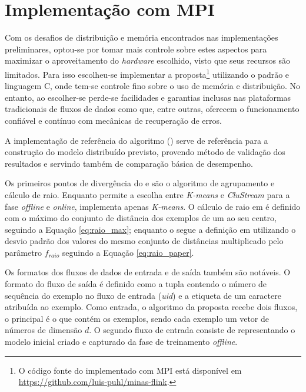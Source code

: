 
\section{Implementação com MPI}

Com os desafios de distribuição e memória encontrados nas implementações
preliminares, optou-se por tomar mais controle sobre estes aspectos para
maximizar o aproveitamento do \emph{hardware} escolhido, visto que seus recursos
são limitados.
Para isso escolheu-se implementar a proposta\footnote{
    O código fonte do \mfog implementado com MPI está disponível em \url{https://github.com/luis-puhl/minas-flink}.
} utilizando o
padrão \mpi e linguagem C, onde tem-se controle fino sobre o uso de memória e
distribuição.
No entanto, ao escolher-se \mpi perde-se facilidades e garantias inclusas nas
plataformas tradicionais de fluxos de dados como \flink que, entre outras,
oferecem o funcionamento confiável e contínuo com mecânicas de recuperação de
erros.

A implementação de referência do algoritmo \minas \cite{Faria2013source}
() serve de referência para a construção do modelo distribuído
previsto, provendo método de validação dos resultados e servindo também de
comparação básica de desempenho.

Os primeiros pontos de divergência do \mfog e  são o algoritmo de
agrupamento e cálculo de raio.
Enquanto  permite a escolha entre \emph{K-means} e \emph{CluStream} para a
fase \emph{offline} e \emph{online}, \mfog implementa apenas \emph{K-means}.
O cálculo de raio em  é definido com o máximo do conjunto de distância
dos exemplos de um \mcluster ao seu centro, seguindo a Equação \ref{eq:raio_max};
enquanto o \mfog segue a definição em  utilizando o
desvio padrão dos valores do mesmo conjunto de distâncias multiplicado pelo
parâmetro $f_{raio}$ seguindo a Equação \ref{eq:raio_paper}.

Os formatos dos fluxos de dados de entrada e de saída também são notáveis.
O formato do fluxo de saída é definido como a tupla contendo o número de
sequência do exemplo no fluxo de entrada (\emph{uid}) e a etiqueta de um caractere
atribuída ao exemplo.
Como
entrada, o algoritmo da proposta recebe dois fluxos, o principal é o que contém
os exemplos, sendo cada exemplo um vetor de números de dimensão $d$.
O segundo fluxo de entrada consiste de \mclusters representando o modelo inicial
criado e capturado da fase de treinamento \emph{offline}.

